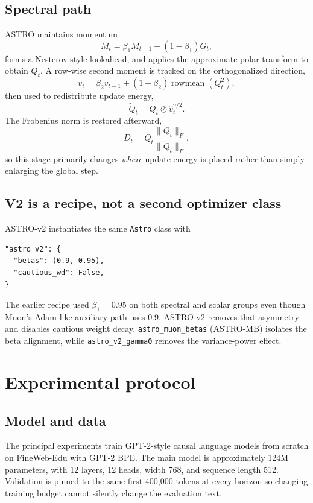\documentclass[10pt,twocolumn]{article}
\newcommand{\norm}[1]{\lVert #1 \rVert}
\begin{document}
\subsection{Spectral path}
ASTRO maintains momentum
\begin{equation}
M_t = \beta_1 M_{t-1} + (1-\beta_1)G_t,
\end{equation}
forms a Nesterov-style lookahead, and applies the approximate polar transform to
obtain $Q_t$. A row-wise second moment is tracked on the orthogonalized
direction,
\begin{equation}
v_t = \beta_2 v_{t-1} + (1-\beta_2)\operatorname{rowmean}(Q_t^2),
\end{equation}
then used to redistribute update energy,
\begin{equation}
\widetilde Q_t = Q_t \oslash \widehat v_t^{\gamma/2}.
\end{equation}
The Frobenius norm is restored afterward,
\begin{equation}
D_t = \widetilde Q_t\frac{\norm{Q_t}_F}{\norm{\widetilde Q_t}_F},
\end{equation}
so this stage primarily changes \emph{where} update energy is placed rather than
simply enlarging the global step.

\subsection{V2 is a recipe, not a second optimizer class}
ASTRO-v2 instantiates the same \texttt{Astro} class with
\begin{verbatim}
"astro_v2": {
  "betas": (0.9, 0.95),
  "cautious_wd": False,
}
\end{verbatim}
The earlier recipe used $\beta_1=0.95$ on both spectral and scalar groups even
though Muon's Adam-like auxiliary path uses $0.9$. ASTRO-v2 removes that
asymmetry and disables cautious weight decay. \texttt{astro\_muon\_betas}
(ASTRO-MB) isolates the beta alignment, while \texttt{astro\_v2\_gamma0}
removes the variance-power effect.

\section{Experimental protocol}

\subsection{Model and data}
The principal experiments train GPT-2-style causal language models from scratch
on FineWeb-Edu with GPT-2 BPE. The main model is approximately 124M parameters,
with 12 layers, 12 heads, width 768, and sequence length 512. Validation is
pinned to the same first 400,000 tokens at every horizon so changing training
budget cannot silently change the evaluation text.
\end{document}
